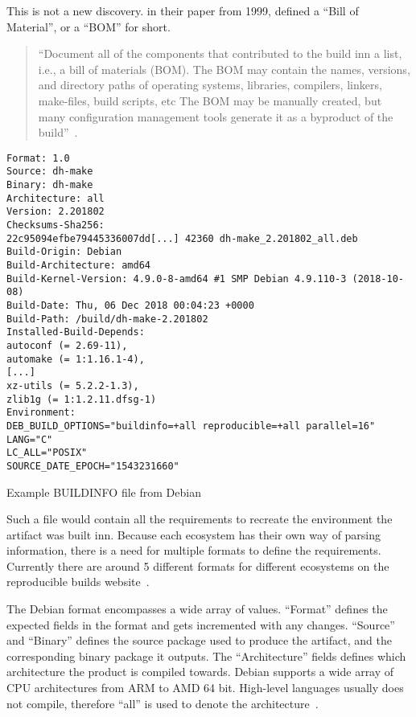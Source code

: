 \documentclass[../Main/thesis.tex]{subfiles}
\begin{document}
This is not a new discovery. \citeauthor{software-reconstruction-1999} in their
paper  from 1999, defined a ``Bill
of Material'', or a ``BOM'' for short.

\begin{quotation}
``Document all of the components that contributed to the build inn a list, i.e.,
a bill of materials (BOM). The BOM may contain the names, versions, and
directory paths of operating systems, libraries, compilers, linkers, make-files,
build scripts, etc The BOM may be manually created, but many configuration
management tools generate it as a byproduct of the build''~\cite{software-reconstruction-1999}.
\end{quotation}

\begin{listing}[H]
\begin{verbatim}
Format: 1.0
Source: dh-make
Binary: dh-make
Architecture: all
Version: 2.201802
Checksums-Sha256:
22c95094efbe79445336007dd[...] 42360 dh-make_2.201802_all.deb
Build-Origin: Debian
Build-Architecture: amd64
Build-Kernel-Version: 4.9.0-8-amd64 #1 SMP Debian 4.9.110-3 (2018-10-08)
Build-Date: Thu, 06 Dec 2018 00:04:23 +0000
Build-Path: /build/dh-make-2.201802
Installed-Build-Depends:
autoconf (= 2.69-11),
automake (= 1:1.16.1-4),
[...]
xz-utils (= 5.2.2-1.3),
zlib1g (= 1:1.2.11.dfsg-1)
Environment:
DEB_BUILD_OPTIONS="buildinfo=+all reproducible=+all parallel=16"
LANG="C"
LC_ALL="POSIX"
SOURCE_DATE_EPOCH="1543231660"
\end{verbatim}
\caption{Example BUILDINFO file from Debian}
\label{lst:buildinfo}
\end{listing}

Such a file would contain all the requirements to recreate the environment the
artifact was built inn. Because each ecosystem has their own way of parsing
information, there is a need for multiple formats to define the requirements.
Currently there are around 5 different formats for different ecosystems on the
reproducible builds website~\cite{reproducible-builds-2019}.

The Debian format encompasses a wide array of values. ``Format'' defines the
expected fields in the format and gets incremented with any changes.  ``Source''
and ``Binary'' defines the source package used to produce the artifact, and the
corresponding binary package it outputs. The ``Architecture'' fields defines
which architecture the product is compiled towards. Debian supports a wide array
of CPU architectures from ARM to AMD 64 bit. High-level languages usually does
not compile, therefore ``all'' is used to denote the
architecture~\cite{deb-buildinfo}.
\end{document}
